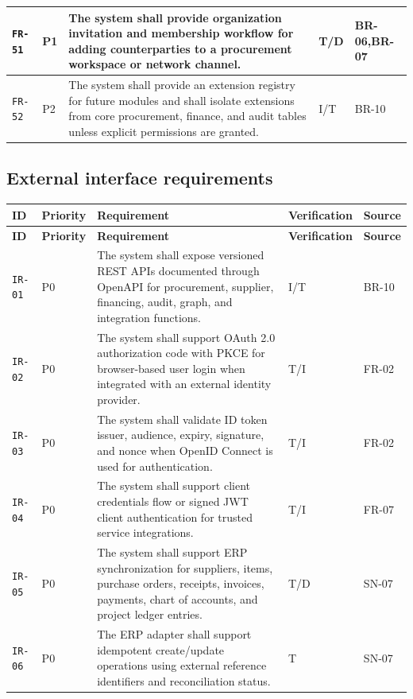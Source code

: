 \documentclass[11pt,a4paper]{article}
\begin{document}
\begin{footnotesize}
\begin{longtable}{@{}p{}p{}p{}p{}p{}@{}}
\texttt{FR-51} & P1 & The system shall provide organization invitation and membership workflow for adding counterparties to a procurement workspace or network channel. & T/D & BR-06,BR-07 \\ \hline
\texttt{FR-52} & P2 & The system shall provide an extension registry for future modules and shall isolate extensions from core procurement, finance, and audit tables unless explicit permissions are granted. & I/T & BR-10 \\ \hline
\end{longtable}
\end{footnotesize}
\subsection{External interface requirements}\label{sec:interfaces}
\begin{footnotesize}
\begin{longtable}{@{}p{}p{}p{}p{}p{}@{}}
\rowcolor{gray!18}\textbf{ID} & \textbf{Priority} & \textbf{Requirement} & \textbf{Verification} & \textbf{Source} \\ \hline
\endfirsthead
\rowcolor{gray!18}\textbf{ID} & \textbf{Priority} & \textbf{Requirement} & \textbf{Verification} & \textbf{Source} \\ \hline
\endhead
\texttt{IR-01} & P0 & The system shall expose versioned REST APIs documented through OpenAPI for procurement, supplier, financing, audit, graph, and integration functions. & I/T & BR-10 \\ \hline
\texttt{IR-02} & P0 & The system shall support OAuth 2.0 authorization code with PKCE for browser-based user login when integrated with an external identity provider. & T/I & FR-02 \\ \hline
\texttt{IR-03} & P0 & The system shall validate ID token issuer, audience, expiry, signature, and nonce when OpenID Connect is used for authentication. & T/I & FR-02 \\ \hline
\texttt{IR-04} & P0 & The system shall support client credentials flow or signed JWT client authentication for trusted service integrations. & T/I & FR-07 \\ \hline
\texttt{IR-05} & P0 & The system shall support ERP synchronization for suppliers, items, purchase orders, receipts, invoices, payments, chart of accounts, and project ledger entries. & T/D & SN-07 \\ \hline
\texttt{IR-06} & P0 & The ERP adapter shall support idempotent create/update operations using external reference identifiers and reconciliation status. & T & SN-07 \\ \hline

\end{longtable}
\end{footnotesize}
\end{document}
